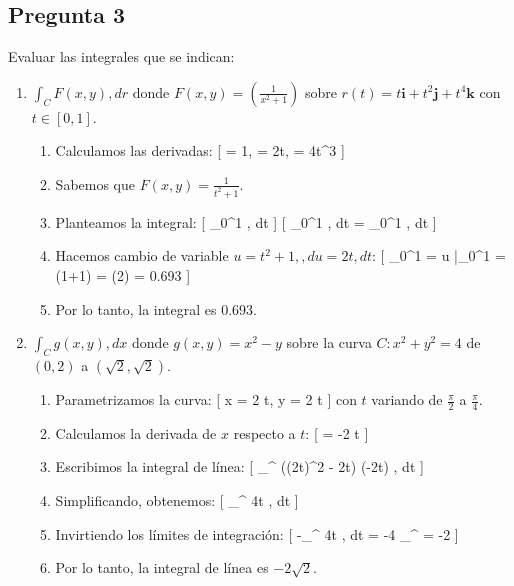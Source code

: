 \documentclass{article}
\begin{document}
    \subsection*{Pregunta 3}
Evaluar las integrales que se indican:
\begin{enumerate}
\item $\int_{C} F(x,y) , dr$ donde $F(x,y) = \left(\frac{1}{x^2 + 1}\right)$ sobre $r(t) = t\mathbf{i} + t^2\mathbf{j} + t^4\mathbf{k}$ con $t \in [0,1]$.
\begin{enumerate}
\item Calculamos las derivadas:
[
 = 1, \quad {} = 2t, \quad {} = 4t^{3}
]
\item Sabemos que $F(x,y) = \frac{1}{t^{2}+1}$.
\item Planteamos la integral:
[
\int_{0}^{1}   , dt
]
[
\int_{0}^{1}   , dt =  \int_{0}^{1}  , dt
]
\item Hacemos cambio de variable $u = t^{2} + 1, , du = 2t , dt$:
[
\int_{0}^{1}  = \ln u \Big|_{0}^{1} = \ln(1+1) = \ln(2) = 0.693
]
\item Por lo tanto, la integral es 0.693.
\end{enumerate}

\item $\int_{C} g(x,y) , dx$ donde $g(x, y) = x^2 - y$ sobre la curva $C: x^2 + y^2 = 4$ de $(0, 2)$ a $(\sqrt{2}, \sqrt{2})$.
\begin{enumerate}
\item Parametrizamos la curva:
[
x = 2 \cos t, \quad y = 2 \sin t
]
con $t$ variando de $\frac{\pi}{2}$ a $\frac{\pi}{4}$.
\item Calculamos la derivada de $x$ respecto a $t$:
[
 = -2 \sin t
]
\item Escribimos la integral de línea:
[
\int_{}^{} \left((2\cos t)^2 - 2\sin t\right) (-2\sin t) , dt
]
\item Simplificando, obtenemos:
[
\int_{}^{} 4\sin t , dt
]
\item Invirtiendo los límites de integración:
[
-\int_{}^{} 4\sin t , dt = -4 _{}^{} = -2
]
\item Por lo tanto, la integral de línea es $-2\sqrt{2}$.
\end{enumerate}


\end{enumerate}
\end{document}
